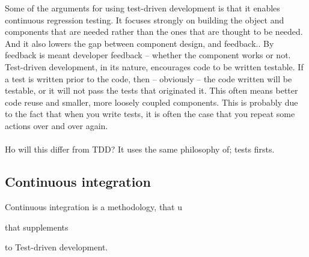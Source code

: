 Some of the arguments for using test-driven development is that it enables continuous regression testing. It focuses strongly on building the object and components that are needed rather than the ones that are thought to be needed. And it also lowers the gap between component design, and feedback.\cite{george2003}. By feedback is meant developer feedback -- whether the component works or not.\\
Test-driven development, in its nature, encourages code to be written testable. If a test is written prior to the code, then -- obviously -- the code written will be testable, or it will not pass the tests that originated it. This often means better code reuse and smaller, more loosely coupled components. This is probably due to the fact that when you write tests, it is often the case that you repeat some actions over and over again.\\\\ %
Ho will this differ from TDD? It uses the same philosophy of; tests firsts.

\subsection{Continuous integration}
Continuous integration is a methodology, that u

 that supplements

 to Test-driven development.


